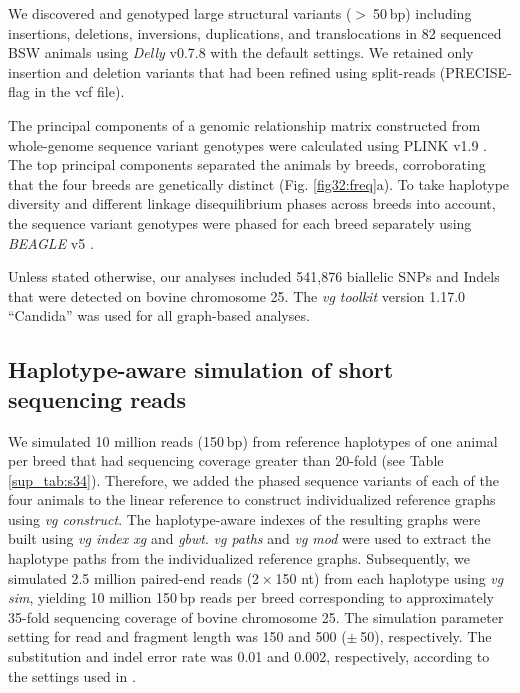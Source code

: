 \documentclass[../main.tex]{subfiles}
\begin{document}
We discovered and genotyped large structural variants ($>$ 50 bp) including insertions, deletions, inversions, duplications, and translocations in 82 sequenced BSW animals using \emph{Delly} v0.7.8 \citep{rausch2012delly} with the default settings. We retained only insertion and deletion variants that had been refined using split-reads (PRECISE-flag in the vcf file).

The principal components of a genomic relationship matrix constructed from whole-genome sequence variant genotypes were calculated using PLINK v1.9 \citep{chang2015second}. The top principal components separated the animals by breeds, corroborating that the four breeds are genetically distinct (Fig. \ref{fig32:freq}a). To take haplotype diversity and different linkage disequilibrium phases across breeds into account, the sequence variant genotypes were phased for each breed separately using \emph{BEAGLE} v5 \citep{browning2018one}.

Unless stated otherwise, our analyses included 541,876 biallelic SNPs and Indels that were detected on bovine chromosome 25. The \emph{vg toolkit} version 1.17.0 “Candida” \citep{garrison2018variation} was used for all graph-based analyses.

\subsection*{Haplotype-aware simulation of short sequencing reads}


We simulated 10 million reads (150 bp) from reference haplotypes of one animal per breed that had sequencing coverage greater than 20-fold (see Table \ref{sup_tab:s34}). Therefore, we added the phased sequence variants of each of the four animals to the linear reference to construct individualized reference graphs using \emph{vg construct}. The haplotype-aware indexes of the resulting graphs were built using \emph{vg index xg} and \emph{gbwt}. \emph{vg paths} and \emph{vg mod} were used to extract the haplotype paths from the individualized reference graphs. Subsequently, we simulated 2.5 million paired-end reads (2 × 150 nt) from each haplotype using \emph{vg sim}, yielding 10 million 150 bp reads per breed corresponding to approximately 35-fold sequencing coverage of bovine chromosome 25. The simulation parameter setting for read and fragment length was 150 and 500 ($\pm$ 50), respectively. The substitution and indel error rate was 0.01 and 0.002, respectively, according to the settings used in \citet{garrison2018variation}.
\end{document}
